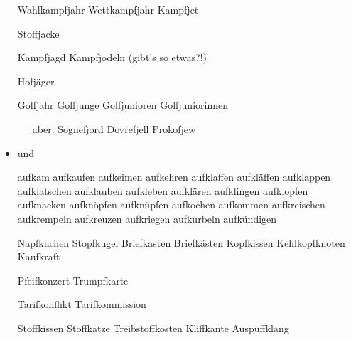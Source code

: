 \begin{itemize}
Wahlkampfjahr Wettkampfjahr Kampfjet

Stoffjacke

Kampfjagd Kampfjodeln (gibt's so etwas?!)

Hofjäger

Golfjahr Golfjunge Golfjunioren Golfjuniorinnen

\ \ \ aber: Sognefjord Dovrefjell Prokofjew



\item {} und  


aufkam aufkaufen aufkeimen aufkehren aufklaffen aufkläffen aufklappen aufklatschen aufklauben aufkleben aufklären aufklingen aufklopfen aufknacken aufknöpfen aufknüpfen aufkochen aufkommen aufkreischen aufkrempeln aufkreuzen aufkriegen aufkurbeln aufkündigen

Napfkuchen Stopfkugel Briefkasten Briefkästen Kopfkissen
 Kehlkopfknoten Kaufkraft

Pfeifkonzert Trumpfkarte

Tarifkonflikt Tarifkommission 

Stoffkissen Stoffkatze Treibstoffkosten Kliffkante Auspuffklang

\end{itemize}



